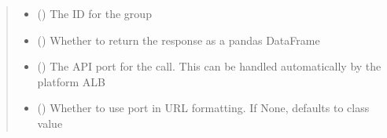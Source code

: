 \documentclass[letterpaper,10pt,english]{sphinxmanual}
\begin{document}
\begin{fulllineitems}
\begin{fulllineitems}
\begin{sphinxVerbatim}[commandchars=\\\{\}]
 
  
\end{sphinxVerbatim}
\begin{quote}\begin{description}
\begin{itemize}
\item {} 
\sphinxAtStartPar
{} () \textendash{} The ID for the group

\item {} 
\sphinxAtStartPar
{} (\sphinxstyleliteralemphasis{\sphinxupquote{ (}}\sphinxstyleliteralemphasis{\sphinxupquote{)}}) \textendash{} Whether to return the response as a pandas DataFrame

\item {} 
\sphinxAtStartPar
{} (\sphinxstyleliteralemphasis{\sphinxupquote{ (}}\sphinxstyleliteralemphasis{\sphinxupquote{)}}) \textendash{} The API port for the call. This can be handled automatically by the platform ALB

\item {} 
\sphinxAtStartPar
{} (\sphinxstyleliteralemphasis{\sphinxupquote{ (}}\sphinxstyleliteralemphasis{\sphinxupquote{)}}) \textendash{} Whether to use port in URL formatting. If None, defaults to class value

\end{itemize}


\end{description}
\end{quote}
\end{fulllineitems}
\end{fulllineitems}
\end{document}
